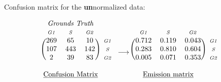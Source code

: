 \documentclass{beamer}
\newcommand{\matindex}[1]{\mbox{\scriptsize#1}}%
\begin{document}
\iffalse

\begin{frame}{Normalizing the data (2/2)}
\begin{itemize}
\item Increases the accuracy to 78\%.
\item Biais and data size reduces by half, only scales to cell trajectories initially starting with a mitosis. We drop to 472 annotated cells.
\item We have very little signal for phase \textit{G2}. 
\end{itemize}
\end{frame}

\fi

\iffalse

Confusion matrix for the \textbf{un}normalized data:

\[
  \begin{blockarray}{cccc}
 \multicolumn{3}{c}{\textit{Grounds Truth}} & \\
    \matindex{\textit{G1}} & \matindex{\textit{S}} &\matindex{\textit{G2}} & \\
    \begin{block}{(ccc)c}
   269 & 65 & 10 & \matindex{\textit{G1}} \\
   107 & 443 & 142 & \matindex{\textit{S}} \\
   2   & 39 & 83 & \matindex{\textit{G2}}  \\
    \end{block}
      &   &    &  \\
      \multicolumn{3}{c}{\underline{Confusion Matrix}} & 
  \end{blockarray}
  \longrightarrow
  \begin{blockarray}{cccc}
 \multicolumn{4}{c}{}  \\
    \matindex{\textit{G1}} & \matindex{\textit{S}} &\matindex{\textit{G2}} & \\
    \begin{block}{(ccc)c}
   0.712 & 0.119 & 0.043 & \matindex{\textit{G1}} \\
   0.283 & 0.810 & 0.604 & \matindex{\textit{S}}  \\
   0.005 & 0.071 & 0.353 & \matindex{\textit{G2}} \\
    \end{block}
      &   &    &  \\
      \multicolumn{3}{c}{\underline{Emission matrix}} &
  \end{blockarray}
\]
\end{document}
